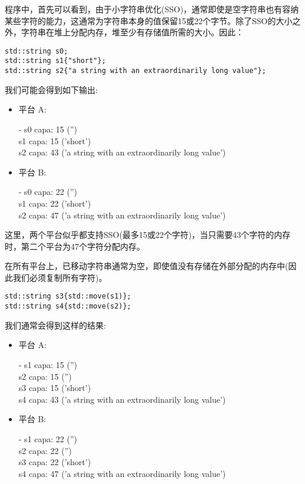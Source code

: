 程序中，首先可以看到，由于小字符串优化(SSO)，通常即使是空字符串也有容纳某些字符的能力，这通常为字符串本身的值保留15或22个字节。除了SSO的大小之外，字符串在堆上分配内存，堆至少有存储值所需的大小。因此：\par

\begin{lstlisting}[caption={}]
std::string s0;
std::string s1{"short"};
std::string s2{"a string with an extraordinarily long value"};
\end{lstlisting}

我们可能会得到如下输出:\par

\begin{itemize}
	\item 平台 A:
	\begin{tcolorbox}[colback=white,colframe=black]
	- s0 capa: 15 ('') \\
	s1 capa: 15 ('short') \\
	s2 capa: 43 ('a string with an extraordinarily long value')
	\end{tcolorbox}	
	\item 平台 B:
	\begin{tcolorbox}[colback=white,colframe=black]
	- s0 capa: 22 ('') \\
	s1 capa: 22 ('short') \\
	s2 capa: 47 ('a string with an extraordinarily long value')
	\end{tcolorbox}	
\end{itemize}

这里，两个平台似乎都支持SSO(最多15或22个字符)，当只需要43个字符的内存时，第二个平台为47个字符分配内存。\par

在所有平台上，已移动字符串通常为空，即使值没有存储在外部分配的内存中(因此我们必须复制所有字符)。\par

\begin{lstlisting}[caption={}]
std::string s3{std::move(s1)};
std::string s4{std::move(s2)};
\end{lstlisting}

我们通常会得到这样的结果:\par

\begin{itemize}
	\item 平台 A:
	\begin{tcolorbox}[colback=white,colframe=black]
	- s1 capa: 15 ('') \\
	s2 capa: 15 ('') \\
	s3 capa: 15 ('short') \\
	s4 capa: 43 ('a string with an extraordinarily long value')
	\end{tcolorbox}	
	\item 平台 B:
	\begin{tcolorbox}[colback=white,colframe=black]
	- s1 capa: 22 ('') \\
	s2 capa: 22 ('') \\
	s3 capa: 22 ('short') \\
	s4 capa: 47 ('a string with an extraordinarily long value')
	\end{tcolorbox}	
\end{itemize}

